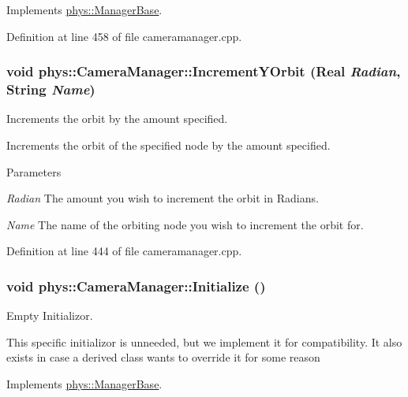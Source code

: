 Implements \hyperlink{classphys_1_1ManagerBase_aff400b6599db635e24796d8221e9a0e3}{phys::ManagerBase}.



Definition at line 458 of file cameramanager.cpp.

\hypertarget{classphys_1_1CameraManager_a82001f0874a090717ced3fbe78ce795b}{
\subsubsection[{IncrementYOrbit}]{\setlength{\rightskip}{0pt plus 5cm}void phys::CameraManager::IncrementYOrbit ({\bf Real} {\em Radian}, \/  {\bf String} {\em Name})}}
\label{d9/d91/classphys_1_1CameraManager_a82001f0874a090717ced3fbe78ce795b}


Increments the orbit by the amount specified. 

Increments the orbit of the specified node by the amount specified. 
\begin{DoxyParams}{Parameters}
\item[{\em Radian}]The amount you wish to increment the orbit in Radians. \item[{\em Name}]The name of the orbiting node you wish to increment the orbit for. \end{DoxyParams}


Definition at line 444 of file cameramanager.cpp.

\hypertarget{classphys_1_1CameraManager_a5e956b61fa341ae576d8d160da518488}{
\subsubsection[{Initialize}]{\setlength{\rightskip}{0pt plus 5cm}void phys::CameraManager::Initialize ()}}
\label{d9/d91/classphys_1_1CameraManager_a5e956b61fa341ae576d8d160da518488}


Empty Initializor. 

This specific initializor is unneeded, but we implement it for compatibility. It also exists in case a derived class wants to override it for some reason 

Implements \hyperlink{classphys_1_1ManagerBase_a57dd8e54e767427d5bdcc86dc66d73ed}{phys::ManagerBase}.



